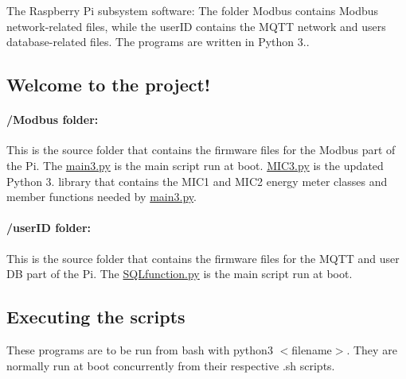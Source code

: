 The Raspberry Pi subsystem software\+: The folder Modbus contains Modbus network-\/related files, while the user\+ID contains the M\+Q\+TT network and users database-\/related files. The programs are written in Python 3.. \subsection*{Welcome to the project!}

\paragraph*{{\ttfamily /\+Modbus} folder\+:}

This is the source folder that contains the firmware files for the Modbus part of the Pi. The \textquotesingle{}\hyperlink{main3_8py}{main3.\+py}\textquotesingle{} is the main script run at boot. \textquotesingle{}\hyperlink{_m_i_c3_8py}{M\+I\+C3.\+py}\textquotesingle{} is the updated Python 3. library that contains the M\+I\+C1 and M\+I\+C2 energy meter classes and member functions needed by \textquotesingle{}\hyperlink{main3_8py}{main3.\+py}\textquotesingle{}.

\paragraph*{{\ttfamily /user\+ID} folder\+:}

This is the source folder that contains the firmware files for the M\+Q\+TT and user DB part of the Pi. The \textquotesingle{}\hyperlink{_s_q_lfunction_8py}{S\+Q\+Lfunction.\+py}\textquotesingle{} is the main script run at boot.

\subsection*{Executing the scripts}

These programs are to be run from bash with \textquotesingle{}python3 $<$filename$>$\textquotesingle{}. They are normally run at boot concurrently from their respective .sh scripts. 